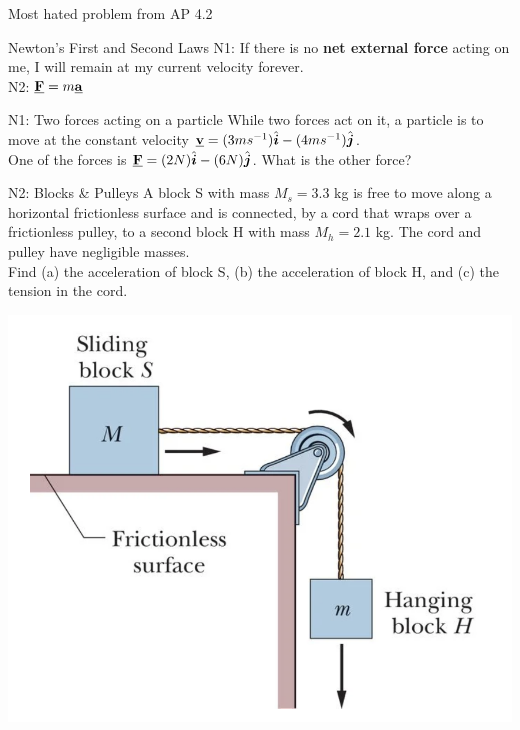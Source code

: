  
 \begin{frame}{Most hated problem from AP 4.2}
\small


\end{frame}


\begin{frame}{Newton's First and Second Laws}
\small
N1: If there is no \textbf{net external force} acting on me, I will remain at my current velocity forever.\\[2ex]
N2: $\underline{\mathbf{F}} = m \underline{\mathbf{a}}$ \\[1ex]
\vspace{10cm}

\end{frame}

\begin{frame}{N1: Two forces acting on a particle}
\small
While two forces act on it, a particle is to move at the constant velocity 
$\underline{\mathbf{v}} = (3ms^{-1})\hat{\boldsymbol{i}} - (4ms^{-1})\hat{\boldsymbol{j}}$.\\
One of the forces is $\underline{\mathbf{F}} = (2N)\hat{\boldsymbol{i}} - (6N)\hat{\boldsymbol{j}}$. What is the other force?
\vspace{10cm}
\end{frame}


\begin{frame}{N2: Blocks \& Pulleys}
\scriptsize
A block S with mass $M_s = 3.3$ kg is free to move along a horizontal frictionless surface and is connected, by a cord that wraps over a frictionless pulley, to a second block H with mass $M_h = 2.1$ kg. The cord and pulley have negligible masses. \\
Find (a) the acceleration of block S, (b) the acceleration of block H, and (c) the tension in the cord.

\includegraphics[scale=0.3]{block-pulley-1}
\vspace{8cm}
\end{frame}


